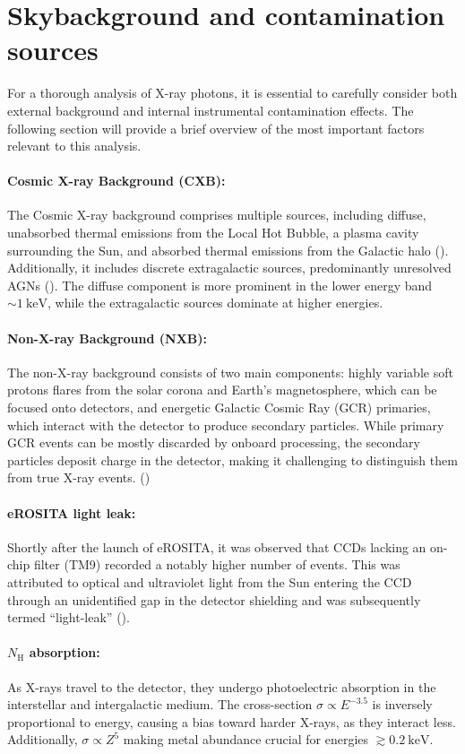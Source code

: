 %
\section{Skybackground and contamination sources}\label{sec:background}
For a thorough analysis of X-ray photons, it is essential to carefully consider both external background and internal instrumental contamination effects. The following section will provide a brief overview of the most important factors relevant to this analysis.
\paragraph*{Cosmic X-ray Background (CXB):} The Cosmic X-ray background comprises multiple sources, including diffuse, unabsorbed thermal emissions from the Local Hot Bubble, a plasma cavity surrounding the Sun, and absorbed thermal emissions from the Galactic halo (\cite{galeazzi2006xmm}). Additionally, it includes discrete extragalactic sources, predominantly unresolved AGNs  (\cite{brandt2005deep}). The diffuse component is more prominent in the lower energy band \(\sim\SI{1}{\kilo\electronvolt}\), while the extragalactic sources dominate at higher energies.
\paragraph*{Non-X-ray Background (NXB):} The non-X-ray background consists of two main components: highly variable soft protons flares from the solar corona and Earth's magnetosphere, which can be focused onto detectors, and energetic Galactic Cosmic Ray (GCR) primaries, which interact with the detector to produce secondary particles. While primary GCR events can be mostly discarded by onboard processing, the secondary particles deposit charge in the detector, making it challenging to distinguish them from true X-ray events. (\cite{Bulbul_2020})
\paragraph*{eROSITA light leak:} Shortly after the launch of eROSITA, it was observed that CCDs lacking an on-chip filter (TM9) recorded a notably higher number of events. This was attributed to optical and ultraviolet light from the Sun entering the CCD through an unidentified gap in the detector shielding and was subsequently termed \enquote{light-leak} (\cite{Predehl2021}). 
\paragraph*{\(N_\text{H}\) absorption:} 
As X-rays travel to the detector, they undergo photoelectric absorption in the interstellar and intergalactic medium. The cross-section \(\sigma \propto E^{-3.5}\) is inversely proportional to energy, causing a bias toward harder X-rays, as they interact less. Additionally, \(\sigma \propto Z^5\) making metal abundance crucial for energies \(\gtrsim \SI{0.2}{\kilo\electronvolt}\).

